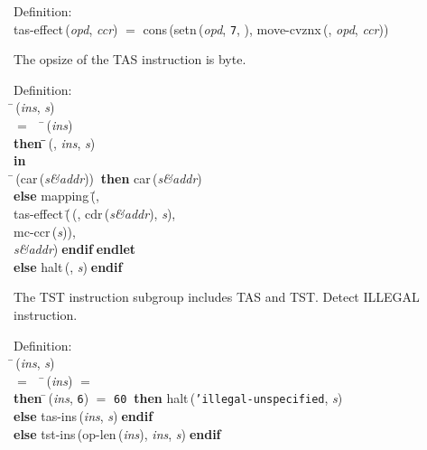 \begin{tabbing}{\sc Definition}: \\  
{\rm{tas-effect}}\,({\it{opd\/}}, {\it{ccr\/}}) $=$ {\rm{cons}}\,({\rm{setn}}\,({\it{opd\/}}, {\tt{7}}, {}), {\rm{move-cvznx}}\,({}, {\it{opd\/}}, {\it{ccr\/}}))
\end{tabbing}

 The opsize of the TAS instruction is byte.
\begin{tabbing}{\sc Definition}: \\  
\=\,({\it{ins\/}}, {\it{s\/}}) \\ 
$=$$\;\;\;\;$\=\,({\it{ins\/}}) \\ 
{\bf then }\=\=\,({}, {\it{ins\/}}, {\it{s\/}})\- \\ 
{\bf in} \\ 
\=\,({\rm{car}}\,({\it{s\&addr\/}}))$\;\;${\bf then }{\rm{car}}\,({\it{s\&addr\/}}) \\ 
{\bf else }{\rm{mapping}}\,(\=, \\ 
{\rm{tas-effect}}\,(\=\,({}, {\rm{cdr}}\,({\it{s\&addr\/}}), {\it{s\/}}), \\ 
{\rm{mc-ccr}}\,({\it{s\/}}))\-, \\ 
{\it{s\&addr\/}})\-$\;${\bf  endif}\-$\;${\bf  endlet}\- \\ 
{\bf else }{\rm{halt}}\,({}, {\it{s\/}})$\;${\bf  endif}\-\-
\end{tabbing}

 The TST instruction subgroup includes TAS and TST.
 Detect ILLEGAL instruction.
\begin{tabbing}{\sc Definition}: \\  
\=\,({\it{ins\/}}, {\it{s\/}}) \\ 
$=$$\;\;\;\;$\=\,({\it{ins\/}}) $=$ {} \\ 
{\bf then }\=\,({\it{ins\/}}, {\tt{6}}) $=$ {\tt{60}}$\;\;${\bf then }{\rm{halt}}\,({\tt{'}}{\tt{illegal-unspecified}}, {\it{s\/}}) \\ 
{\bf else }{\rm{tas-ins}}\,({\it{ins\/}}, {\it{s\/}})$\;${\bf  endif}\- \\ 
{\bf else }{\rm{tst-ins}}\,({\rm{op-len}}\,({\it{ins\/}}), {\it{ins\/}}, {\it{s\/}})$\;${\bf  endif}\-\-
\end{tabbing}

